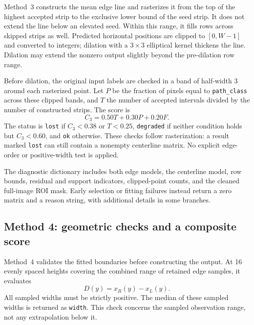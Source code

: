 Method~3 constructs the mean edge line and rasterizes it from the top
of the highest accepted strip to the exclusive lower bound of the seed
strip. It does not extend the line below an elevated seed. Within this
range, it fills rows across skipped strips as well. Predicted horizontal
positions are clipped to $[0,W-1]$ and converted to integers; dilation
with a $3\times3$ elliptical kernel thickens the line. Dilation may extend
the nonzero output slightly beyond the pre-dilation row range.

Before dilation, the original input labels are checked in a band of
half-width 3 around each rasterized point. Let $P$ be the fraction of
pixels equal to \texttt{path\_class} across these clipped bands, and
$T$ the number of accepted intervals divided by the number of constructed
strips. The score is
\begin{equation}
    C_3=0.50T+0.30P+0.20F.
    \label{eq:c4_confidence3}
\end{equation}
The status is \texttt{lost} if $C_3<0.38$ or $T<0.25$,
\texttt{degraded} if neither condition holds but $C_3<0.60$, and
\texttt{ok} otherwise. These checks follow rasterization: a result marked
\texttt{lost} can still contain a nonempty centerline matrix. No explicit
edge-order or positive-width test is applied.

The diagnostic dictionary includes both edge models, the centerline
model, row bounds, residual and support indicators, clipped-point counts,
and the cleaned full-image ROI mask. Early selection or fitting failures
instead return a zero matrix and a reason string, with additional details
in some branches.

\subsection{Method 4: geometric checks and a composite score}
\label{subsec:c4_output4}

Method~4 validates the fitted boundaries before constructing the output.
At 16 evenly spaced heights covering the combined range of retained
edge samples, it evaluates
\begin{equation}
    D(y)=x_R(y)-x_L(y).
\end{equation}
All sampled widths must be strictly positive. The median of these
sampled widths is returned as \texttt{width}. This check concerns the
sampled observation range, not any extrapolation below it.

